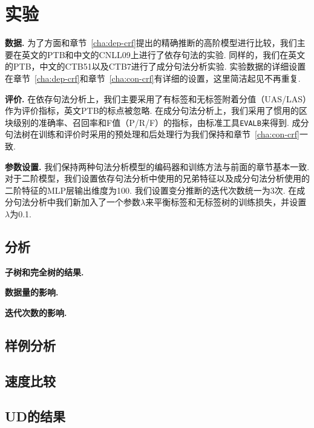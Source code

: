 \section{实验}\label{sec:vi-exp}

\noindent\textbf{数据.}
为了方面和章节~\ref{cha:dep-crf}提出的精确推断的高阶模型进行比较，我们主要在英文的PTB和中文的CNLL09上进行了依存句法的实验.
同样的，我们在英文的PTB，中文的CTB51以及CTB7进行了成分句法分析实验.
实验数据的详细设置在章节~\ref{cha:dep-crf}和章节~\ref{cha:con-crf}有详细的设置，这里简洁起见不再重复.

\noindent\textbf{评价.}
在依存句法分析上，我们主要采用了有标签和无标签附着分值（UAS/LAS）作为评价指标，英文PTB的标点被忽略.
在成分句法分析上，我们采用了惯用的区块级别的准确率、召回率和F值（P/R/F）的指标，由标准工具\texttt{EVALB}来得到.
成分句法树在训练和评价时采用的预处理和后处理行为我们保持和章节~\ref{cha:con-crf}一致.

\noindent\textbf{参数设置.}
我们保持两种句法分析模型的编码器和训练方法与前面的章节基本一致.
对于二阶模型，我们设置依存句法分析中使用的兄弟特征以及成分句法分析使用的二阶特征的MLP层输出维度为100.
我们设置变分推断的迭代次数统一为3次.
在成分句法分析中我们新加入了一个参数$\lambda$来平衡标签和无标签树的训练损失，并设置$\lambda$为0.1.



\subsection{分析}

\noindent\textbf{子树和完全树的结果.}

\noindent\textbf{数据量的影响.}

\noindent\textbf{迭代次数的影响.}

\subsection{样例分析}

\subsection{速度比较}

\subsection{UD的结果}
